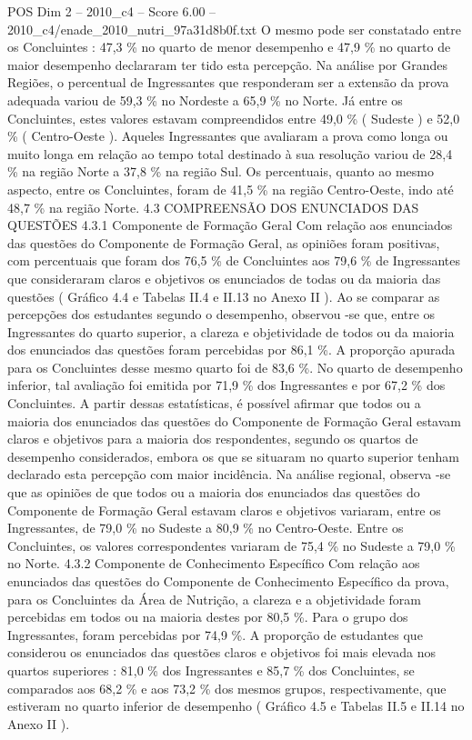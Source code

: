 \begin{textsample}{POS Dim 2 – 2010\_c4 – Score 6.00 – 2010\_c4/enade\_2010\_nutri\_97a31d8b0f.txt}
O mesmo pode ser constatado entre os Concluintes : 47,3 \% no quarto de menor desempenho e 47,9 \% no quarto de maior desempenho declararam ter tido esta percepção.
Na análise por Grandes Regiões, o percentual de Ingressantes que responderam ser a extensão da prova adequada variou de 59,3 \% no Nordeste a 65,9 \% no Norte.
Já entre os Concluintes, estes valores estavam compreendidos entre 49,0 \% ( Sudeste ) e 52,0 \% ( Centro-Oeste ).
Aqueles Ingressantes que avaliaram a prova como longa ou muito longa em relação ao tempo total destinado à sua resolução variou de 28,4 \% na região Norte a 37,8 \% na região Sul.
Os percentuais, quanto ao mesmo aspecto, entre os Concluintes, foram de 41,5 \% na região Centro-Oeste, indo até 48,7 \% na região Norte. 4.3 COMPREENSÃO DOS ENUNCIADOS DAS QUESTÕES 4.3.1 Componente de Formação Geral Com relação aos enunciados das questões do Componente de Formação Geral, as opiniões foram positivas, com percentuais que foram dos 76,5 \% de Concluintes aos 79,6 \% de Ingressantes que consideraram claros e objetivos os enunciados de todas ou da maioria das questões ( Gráfico 4.4 e Tabelas II.4 e II.13 no Anexo II ).
Ao se comparar as percepções dos estudantes segundo o desempenho, observou -se que, entre os Ingressantes do quarto superior, a clareza e objetividade de todos ou da maioria dos enunciados das questões foram percebidas por 86,1 \%.
A proporção apurada para os Concluintes desse mesmo quarto foi de 83,6 \%.
No quarto de desempenho inferior, tal avaliação foi emitida por 71,9 \% dos Ingressantes e por 67,2 \% dos Concluintes.
A partir dessas estatísticas, é possível afirmar que todos ou a maioria dos enunciados das questões do Componente de Formação Geral estavam claros e objetivos para a maioria dos respondentes, segundo os quartos de desempenho considerados, embora os que se situaram no quarto superior tenham declarado esta percepção com maior incidência.
Na análise regional, observa -se que as opiniões de que todos ou a maioria dos enunciados das questões do Componente de Formação Geral estavam claros e objetivos variaram, entre os Ingressantes, de 79,0 \% no Sudeste a 80,9 \% no Centro-Oeste.
Entre os Concluintes, os valores correspondentes variaram de 75,4 \% no Sudeste a 79,0 \% no Norte. 4.3.2 Componente de Conhecimento Específico Com relação aos enunciados das questões do Componente de Conhecimento Específico da prova, para os Concluintes da Área de Nutrição, a clareza e a objetividade foram percebidas em todos ou na maioria destes por 80,5 \%.
Para o grupo dos Ingressantes, foram percebidas por 74,9 \%.
A proporção de estudantes que considerou os enunciados das questões claros e objetivos foi mais elevada nos quartos superiores : 81,0 \% dos Ingressantes e 85,7 \% dos Concluintes, se comparados aos 68,2 \% e aos 73,2 \% dos mesmos grupos, respectivamente, que estiveram no quarto inferior de desempenho ( Gráfico 4.5 e Tabelas II.5 e II.14 no Anexo II ).

\end{textsample}
